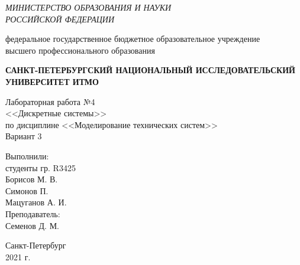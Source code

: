 \begin{titlepage}
    \begin{center}
        \textit{МИНИСТЕРСТВО ОБРАЗОВАНИЯ И НАУКИ\\
        РОССИЙСКОЙ ФЕДЕРАЦИИ}
        \vspace{1ex}

        федеральное государственное бюджетное образовательное учреждение\\
        высшего профессионального образования
        \vspace{1ex}

        \textbf{САНКТ-ПЕТЕРБУРГСКИЙ НАЦИОНАЛЬНЫЙ ИССЛЕДОВАТЕЛЬСКИЙ УНИВЕРСИТЕТ ИТМО}
        \vspace{13ex}

        Лабораторная работа №4\\
        <<Дискретные системы>>\\
        по дисциплине <<Моделирование технических систем>>\\
        \vspace{1em}
        Вариант 3\\
    \end{center}
    \vspace{14em}
    \begin{flushright}
        \noindent
        Выполнили:\\
        студенты гр. R3425\\
        Борисов М. В.\\
        Симонов П.\\
        Мацуганов А. И.\\
        \vspace{1em}
        Преподаватель:\\
        Семенов Д. М.
    \end{flushright}
    \vfill
    \begin{center}
        \large{Санкт-Петербург}\\
        2021 г.\\
    \end{center}
\end{titlepage}
